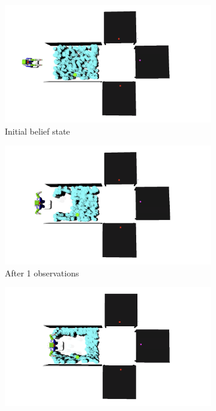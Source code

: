 \begin{figure}
  \centering
  \begin{subfigure}[b]{0.22\linewidth}
    \includegraphics[width=\textwidth]{corridor_images/0-observe.png}
    \caption{Initial belief state}
    \label{fig:step1}
  \end{subfigure}
  \begin{subfigure}[b]{0.22\linewidth}
    \includegraphics[width=\textwidth]{corridor_images/1-observe.png}
    \caption{After 1 observations}
    \label{fig:step2}
  \end{subfigure}
  \begin{subfigure}[b]{0.22\linewidth}
    \includegraphics[width=\textwidth]{corridor_images/2-observe.png}

\end{subfigure}
\end{figure}
